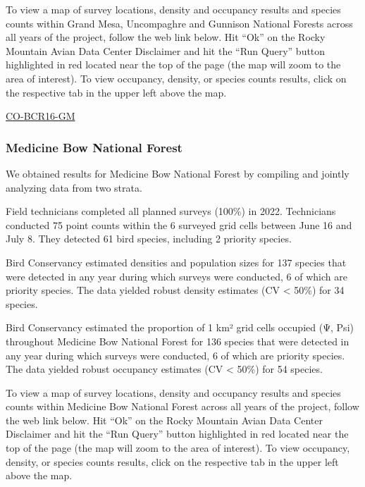 \documentclass[
  letterpaper,
  DIV=11,
  numbers=noendperiod,
  oneside]{scrreprt}
\begin{document}
To view a map of survey locations, density and occupancy results and
species counts within Grand Mesa, Uncompaghre and Gunnison National
Forests across all years of the project, follow the web link below. Hit
``Ok'' on the Rocky Mountain Avian Data Center Disclaimer and hit the
``Run Query'' button highlighted in red located near the top of the page
(the map will zoom to the area of interest). To view occupancy, density,
or species counts results, click on the respective tab in the upper left
above the map.

\href{http://www.rmbo.org/new_site/adc/QueryWindow.aspx\#N4IgzgLgTghhCuBbEAuABCAwgeQLQCFMAlARgDZcBxAWXUtgDsATNagUzBgG40BVBgMYB7RAAcYACwDmUNmhjM0leAwYBLMEIZoAcnDVaYAGzQAxIbMhgQAXyA==}{CO-BCR16-GM}

\hypertarget{medicine-bow-national-forest}{%
\subsubsection{Medicine Bow National
Forest}\label{medicine-bow-national-forest}}

We obtained results for Medicine Bow National Forest by compiling and
jointly analyzing data from two strata.

Field technicians completed all planned surveys (100\%) in 2022.
Technicians conducted 75 point counts within the 6 surveyed grid cells
between June 16 and July 8. They detected 61 bird species, including 2
priority species.

Bird Conservancy estimated densities and population sizes for 137
species that were detected in any year during which surveys were
conducted, 6 of which are priority species. The data yielded robust
density estimates (CV \textless{} 50\%) for 34 species.

Bird Conservancy estimated the proportion of 1 km² grid cells occupied
(Ψ, Psi) throughout Medicine Bow National Forest for 136 species that
were detected in any year during which surveys were conducted, 6 of
which are priority species. The data yielded robust occupancy estimates
(CV \textless{} 50\%) for 54 species.

To view a map of survey locations, density and occupancy results and
species counts within Medicine Bow National Forest across all years of
the project, follow the web link below. Hit ``Ok'' on the Rocky Mountain
Avian Data Center Disclaimer and hit the ``Run Query'' button
highlighted in red located near the top of the page (the map will zoom
to the area of interest). To view occupancy, density, or species counts
results, click on the respective tab in the upper left above the map.
\end{document}
